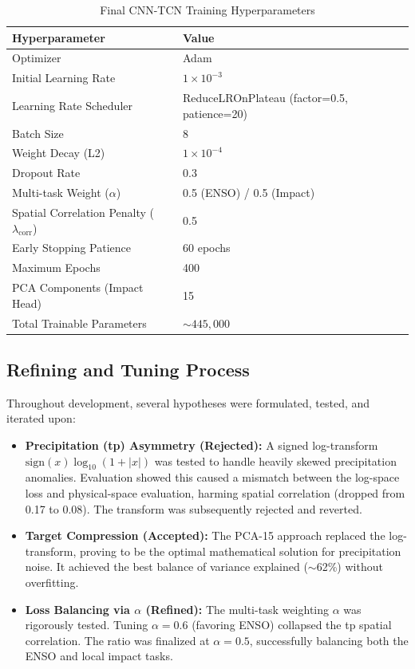 \begin{table}[H]
\centering
\caption{Final CNN-TCN Training Hyperparameters}
\label{tab:cnn_tcn_hyperparams_final}
\renewcommand{\arraystretch}{1.2}
\begin{tabular}{|l|l|}
\hline
\textbf{Hyperparameter} & \textbf{Value} \\
\hline
Optimizer & Adam \\
\hline
Initial Learning Rate & $1 \times 10^{-3}$ \\
\hline
Learning Rate Scheduler & ReduceLROnPlateau (factor=0.5, patience=20) \\
\hline
Batch Size & 8 \\
\hline
Weight Decay (L2) & $1 \times 10^{-4}$ \\
\hline
Dropout Rate & 0.3 \\
\hline
Multi-task Weight ($\alpha$) & 0.5 (ENSO) / 0.5 (Impact) \\
\hline
Spatial Correlation Penalty ($\lambda_{\text{corr}}$) & 0.5 \\
\hline
Early Stopping Patience & 60 epochs \\
\hline
Maximum Epochs & 400 \\
\hline
PCA Components (Impact Head) & 15 \\
\hline
Total Trainable Parameters & $\sim 445,000$ \\
\hline
\end{tabular}
\end{table}

\subsection{Refining and Tuning Process}
Throughout development, several hypotheses were formulated, tested, and iterated upon:
\begin{itemize}
\item \textbf{Precipitation (tp) Asymmetry (Rejected):} A signed log-transform $\text{sign}(x)\log_{10}(1+|x|)$ was tested to handle heavily skewed precipitation anomalies. Evaluation showed this caused a mismatch between the log-space loss and physical-space evaluation, harming spatial correlation (dropped from 0.17 to 0.08). The transform was subsequently rejected and reverted.
\item \textbf{Target Compression (Accepted):} The PCA-15 approach replaced the log-transform, proving to be the optimal mathematical solution for precipitation noise. It achieved the best balance of variance explained ($\sim$62\%) without overfitting.
\item \textbf{Loss Balancing via $\alpha$ (Refined):} The multi-task weighting $\alpha$ was rigorously tested. Tuning $\alpha = 0.6$ (favoring ENSO) collapsed the tp spatial correlation. The ratio was finalized at $\alpha = 0.5$, successfully balancing both the ENSO and local impact tasks.
\end{itemize}

